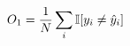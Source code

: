 \documentclass[preview]{standalone}
\begin{document}
\begin{align*}
\special{dvisvgm:raw <g id='unique000'>}O_1 = \frac{1}{N}\sum_i \mathbb{I}[y_i \neq \hat y_i]\special{dvisvgm:raw </g>}
\end{align*}
\end{document}
